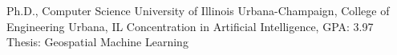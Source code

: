
        {Ph.D., Computer Science}
        {University of Illinois Urbana-Champaign, College of Engineering}
        {Urbana, IL}
        {Concentration in Artificial Intelligence, GPA: 3.97}
        {Thesis: Geospatial Machine Learning}
